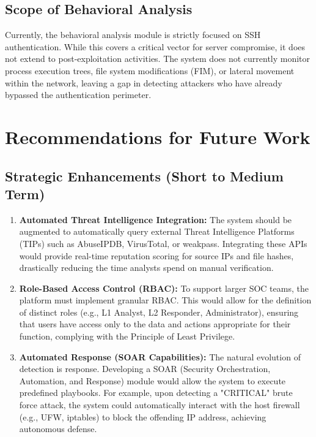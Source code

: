 \documentclass[12pt,a4paper]{report} %
\begin{document}
\subsection{Scope of Behavioral Analysis}
Currently, the behavioral analysis module is strictly focused on SSH authentication. While this covers a critical vector for server compromise, it does not extend to post-exploitation activities. The system does not currently monitor process execution trees, file system modifications (FIM), or lateral movement within the network, leaving a gap in detecting attackers who have already bypassed the authentication perimeter.

\section{Recommendations for Future Work}

\subsection{Strategic Enhancements (Short to Medium Term)}
\begin{enumerate}
    \item \textbf{Automated Threat Intelligence Integration:} The system should be augmented to automatically query external Threat Intelligence Platforms (TIPs) such as AbuseIPDB, VirusTotal, or weakpass. Integrating these APIs would provide real-time reputation scoring for source IPs and file hashes, drastically reducing the time analysts spend on manual verification.
    \item \textbf{Role-Based Access Control (RBAC):} To support larger SOC teams, the platform must implement granular RBAC. This would allow for the definition of distinct roles (e.g., L1 Analyst, L2 Responder, Administrator), ensuring that users have access only to the data and actions appropriate for their function, complying with the Principle of Least Privilege.
    \item \textbf{Automated Response (SOAR Capabilities):} The natural evolution of detection is response. Developing a SOAR (Security Orchestration, Automation, and Response) module would allow the system to execute predefined playbooks. For example, upon detecting a "CRITICAL" brute force attack, the system could automatically interact with the host firewall (e.g., UFW, iptables) to block the offending IP address, achieving autonomous defense.
\end{enumerate}
\end{document}
